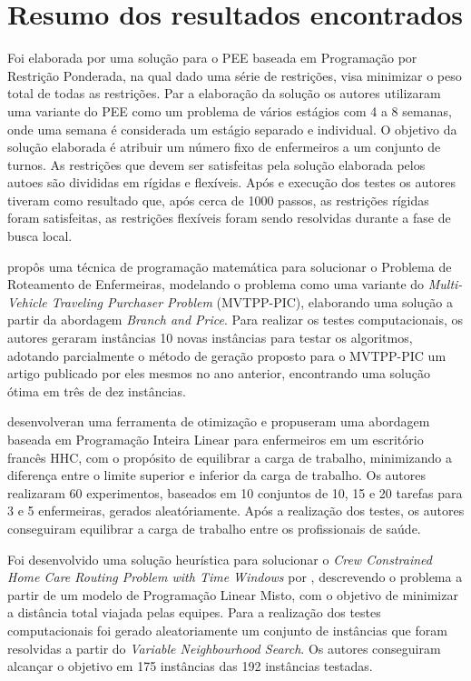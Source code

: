 \section{Resumo dos resultados encontrados}

Foi elaborada por \cite{santos:2015} uma solução para o \ac{PEE} baseada em Programação por Restrição Ponderada, na qual dado uma série de restrições, visa minimizar o peso total de todas as restrições. Par a elaboração da solução os autores utilizaram uma variante do \ac{PEE} como um problema de vários estágios com 4 a 8 semanas, onde uma semana é considerada um estágio separado e individual. O objetivo da solução elaborada é atribuir um número fixo de enfermeiros a um conjunto de turnos. As restrições que devem ser satisfeitas pela solução elaborada pelos autoes são divididas em rígidas e flexíveis.
Após e execução dos testes os autores tiveram como resultado que, após cerca de 1000 passos, as restrições rígidas foram satisfeitas, as restrições flexíveis foram sendo resolvidas durante a fase de busca local.

\cite{mansini:2016} propôs uma técnica de programação matemática para solucionar o Problema de Roteamento de Enfermeiras, modelando o problema como uma variante do \textit{Multi-Vehicle Traveling Purchaser Problem} (MVTPP-PIC), elaborando uma solução a partir da abordagem \textit{Branch and Price}. Para realizar os testes computacionais, os autores geraram instâncias 10 novas instâncias para testar os algoritmos, adotando parcialmente o método de geração proposto para o MVTPP-PIC um artigo publicado por eles mesmos no ano anterior, encontrando uma solução ótima em três de  dez instâncias.

\cite{bachouch:2010} desenvolveran uma ferramenta de otimização e propuseram uma abordagem baseada em Programação Inteira Linear  para enfermeiros em um escritório francês HHC, com o propósito de equilibrar a carga de trabalho, minimizando a diferença entre o limite superior e inferior da carga de trabalho. Os autores realizaram 60 experimentos, baseados em 10 conjuntos de 10, 15 e 20 tarefas para 3 e 5 enfermeiras, gerados aleatóriamente. Após a realização dos testes, os autores conseguiram equilibrar a carga de trabalho entre os profissionais de saúde.

Foi desenvolvido uma solução heurística para solucionar o \textit{Crew Constrained Home Care Routing Problem with Time Windows} por \cite{tozlu:2016}, descrevendo o problema a partir de um modelo de Programação Linear Misto, com o objetivo de minimizar a distância total viajada pelas equipes. Para a realização dos testes computacionais foi gerado aleatoriamente um conjunto de instâncias que foram  resolvidas a partir do \textit{Variable Neighbourhood Search}. Os autores conseguiram alcançar o objetivo em 175 instâncias das 192 instâncias testadas.

